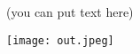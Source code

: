 \documentclass{article}
\begin{document}
(you can put text here)

\texttt{[image: out.jpeg]}%
\end{document}
